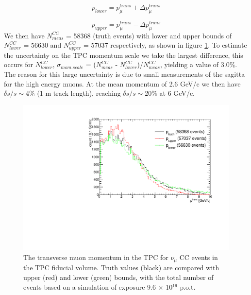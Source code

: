 \begin{equation}
	p_{lower} = p^{trans}_{\mu} + \Delta{p^{trans}_{\mu}}
	\label{eq:ccSumTransMomLower}
\end{equation}

\begin{equation}
	p_{upper} = p^{trans}_{\mu} - \Delta{p^{trans}_{\mu}}
	\label{eq:ccSumTransMomUpper}
\end{equation}
We then have $N^{CC}_{meas}$ = 58368 (truth events) with lower and upper bounds of $N^{CC}_{lower}$ = 56630 and $N^{CC}_{upper}$ = 57037 respectively, as shown in figure \ref{fig:muonTransMomSmearLowerAndUpperBounds}. To estimate the uncertainty on the TPC momentum scale we take the largest difference, this occurs for $N^{CC}_{lower}$, $\sigma_{mom. scale}$ = ($N^{CC}_{meas}$ - $N^{CC}_{lower}$)/$N^{CC}_{meas}$, yielding a value of 3.0\%. The reason for this large uncertainty is due to small measurements of the sagitta for the high energy muons. At the mean momentum of 2.6 GeV/c we then have $\delta{s}/s \sim$4\% (1 m track length), reaching $\delta{s}/s \sim$20\% at 6 GeV/c. 

\begin{figure}[htbp]
\begin{center}
  	\includegraphics[width=120mm]{Chapter4/figures/measured_muon_mom_tpc_scale_variation.pdf}
	\caption{The transverse muon momentum in the TPC for $\nu_{\mu}$ CC events in the TPC fiducial volume. Truth values (black) are compared with upper (red) and lower (green) bounds, with the total number of events based on a simulation of exposure 9.6 $\times$ 10$^{19}$ p.o.t. }
	\label{fig:muonTransMomSmearLowerAndUpperBounds}
\end{center}
\end{figure}

